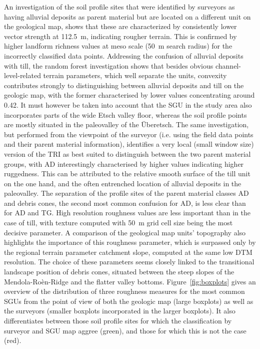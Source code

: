 \documentclass[preprint,12pt,authoryear]{elsarticle}
\begin{document}
An investigation of the soil profile sites that were identified by surveyors as having alluvial deposits as parent material but are located on a different unit on the geological map, shows that these are characterized by consistently lower vector strength at 112.5~m, indicating rougher terrain. This is confirmed by higher landform richness values at meso scale (50~m search radius) for the incorrectly classified data points. 
Addressing the confusion of alluvial deposits with till, the random forest investigation shows that besides obvious channel-level-related terrain parameters, which well separate the units, convexity contributes strongly to distinguishing between alluvial deposits and till on the geologic map, with the former characterised by lower values concentrating around 0.42. It must however be taken into account that the SGU in the study area also incorporates parts of the wide Etsch valley floor, whereas the soil profile points are mostly situated in the paleovalley of the {\"U}beretsch.
The same investigation, but performed from the viewpoint of the surveyor (i.e. using the field data points and their parent material information), identifies a very local (small window size) version of the TRI as best suited to distinguish between the two parent material groups, with AD interestingly characterised by higher values indicating higher ruggedness. This can be attributed to the relative smooth surface of the till unit on the one hand, and the often entrenched location of alluvial deposits in the paleovalley. The separation of the profile sites of the parent material classes AD and debris cones, the second most common confusion for AD, is less clear than for AD and TG. High resolution roughness values are less important than in the case of till, with texture computed with  50~m grid cell size being the most decisive parameter. A comparison of the geological map units' topography also highlights the importance of this roughness parameter, which is surpassed only by the regional terrain parameter catchment slope, computed at the same low DTM resolution. The choice of these parameters seems closely linked to the transitional landscape position of debris cones, situated between the steep slopes of the Mendola-Ro\`en-Ridge and the flatter valley bottoms. Figure~\ref{fig:boxplots} gives an overview of the distribution of three roughness measures for the most common SGUs from the point of view of both the geologic map (large boxplots) as well as the surveyors (smaller boxplots incorporated in the larger boxplots). It also differentiates between those soil profile sites for which the classification by surveyor and SGU map aggree (green), and those for which this is not the case (red).
\end{document}
